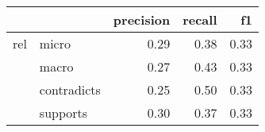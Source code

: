 \begin{tabular}{llrrr}
\toprule
    &          &  precision &  recall &   f1 \\
\midrule
rel & micro &       0.29 &    0.38 & 0.33 \\
    & macro &       0.27 &    0.43 & 0.33 \\
    & contradicts &       0.25 &    0.50 & 0.33 \\
    & supports &       0.30 &    0.37 & 0.33 \\
\bottomrule
\end{tabular}
